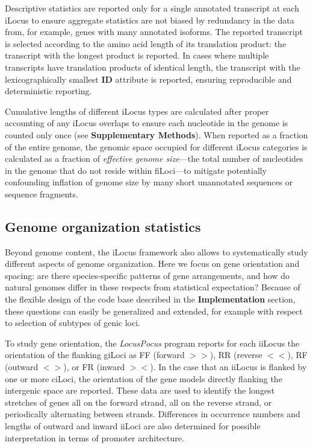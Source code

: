 Descriptive statistics are reported only for a single annotated transcript at each iLocus to ensure aggregate statistics are not biased by redundancy in the data from, for example, genes with many annotated isoforms.
The reported transcript is selected according to the amino acid length of its translation product: the transcript with the longest product is reported.
In cases where multiple transcripts have translation products of identical length, the transcript with the lexicographically smallest \textbf{ID} attribute is reported, ensuring reproducible and deterministic reporting.

Cumulative lengths of different iLocus types are calculated after proper accounting of any iLocus overlaps to ensure each nucleotide in the genome is counted only once (see \textbf{Supplementary Methods}).
When reported as a fraction of the entire genome, the genomic space occupied for different iLocus categories is calculated as a fraction of \textit{effective genome size}---the total number of nucleotides in the genome that do not reside within fiLoci---to mitigate potentially confounding inflation of genome size by many short unannotated sequences or sequence fragments.

\subsection{Genome organization statistics}
Beyond genome content, the iLocus framework also allows to systematically study different aspects of genome organization.
Here we focus on gene orientation and spacing: are there species-specific patterns of gene arrangements, and how do natural genomes differ in these respects from statistical expectation?
Because of the flexible design of the code base described in the \textbf{Implementation} section, these questions can easily be generalized and extended, for example with respect to selection of subtypes of genic loci.

To study gene orientation, the \textit{LocusPocus} program reports for each iiLocus the orientation of the flanking giLoci as FF (forward $>>$), RR (reverse $<<$), RF (outward $<>$), or FR (inward $><$).
In the case that an iiLocus is flanked by one or more ciLoci, the orientation of the gene models directly flanking the intergenic space are reported.
These data are used to identify the longest stretches of genes all on the forward strand, all on the reverse strand, or periodically alternating between strands.
Differences in occurrence numbers and lengths of outward and inward iiLoci are also determined for possible interpretation in terms of promoter architecture.


